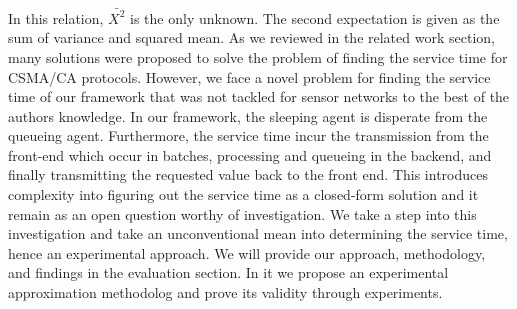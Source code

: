 In this relation, $\bar{X^2}$ is the only unknown. The second expectation is given as the sum of variance and squared mean. As we reviewed in the related work section, many solutions were proposed to solve the problem of finding the service time for CSMA/CA protocols. However, we face a novel problem for finding the service time of our framework that was not tackled for sensor networks to the best of the authors knowledge. In our framework, the sleeping agent is disperate from the queueing agent. Furthermore, the service time incur the transmission from the front-end which occur in batches, processing and queueing in the backend, and finally transmitting the requested value back to the front end. This introduces complexity into figuring out the service time as a closed-form solution and it remain as an open question worthy of investigation. We take a step into this investigation and take an unconventional mean into determining the service time, hence an experimental approach. We will provide our approach, methodology, and findings in the evaluation section. In it we propose an experimental approximation methodolog and prove its validity through experiments.

